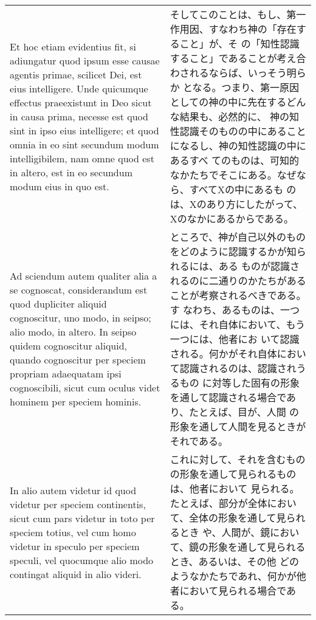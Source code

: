 \documentclass[10pt]{jsarticle} %
\begin{document}
\begin{longtable}{p{21em}p{21em}}
\\

Et hoc etiam evidentius fit, si adiungatur quod ipsum esse causae
agentis primae, scilicet Dei, est eius intelligere. Unde quicumque
effectus praeexistunt in Deo sicut in causa prima, necesse est quod
sint in ipso eius intelligere; et quod omnia in eo sint secundum modum
intelligibilem, nam omne quod est in altero, est in eo secundum modum
eius in quo est.

&

そしてこのことは、もし、第一作用因、すなわち神の「存在すること」が、そ
の「知性認識すること」であることが考え合わされるならば、いっそう明らか
となる。つまり、第一原因としての神の中に先在するどんな結果も、必然的に、
神の知性認識そのものの中にあることになるし、神の知性認識の中にあるすべ
てのものは、可知的なかたちでそこにある。なぜなら、すべてXの中にあるも
のは、Xのあり方にしたがって、Xのなかにあるからである。

\\


Ad sciendum autem qualiter alia a se cognoscat, considerandum est quod
dupliciter aliquid cognoscitur, uno modo, in seipso; alio modo, in
altero. In seipso quidem cognoscitur aliquid, quando cognoscitur per
speciem propriam adaequatam ipsi cognoscibili, sicut cum oculus videt
hominem per speciem hominis.


&

ところで、神が自己以外のものをどのように認識するかが知られるには、ある
ものが認識されるのに二通りのかたちがあることが考察されるべきである。す
なわち、あるものは、一つには、それ自体において、もう一つには、他者にお
いて認識される。何かがそれ自体において認識されるのは、認識されうるもの
に対等した固有の形象を通して認識される場合であり、たとえば、目が、人間
の形象を通して人間を見るときがそれである。


\\


In alio autem videtur id quod videtur per speciem continentis, sicut
cum pars videtur in toto per speciem totius, vel cum homo videtur in
speculo per speciem speculi, vel quocumque alio modo contingat aliquid
in alio videri.



&

これに対して、それを含むものの形象を通して見られるものは、他者において
見られる。たとえば、部分が全体において、全体の形象を通して見られるとき
や、人間が、鏡において、鏡の形象を通して見られるとき、あるいは、その他
どのようなかたちであれ、何かが他者において見られる場合である。


\end{longtable}
\end{document}
